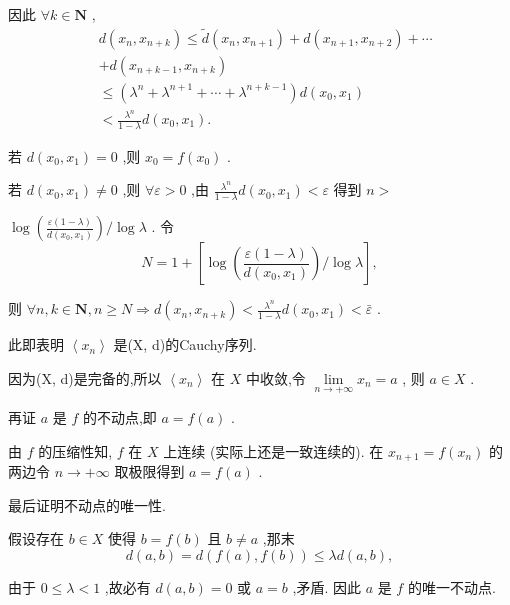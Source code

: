 因此 $\forall k \in  \mathbf{N}$ ,
\begin{align*}
	&d\left( {{x}_{n},{x}_{n + k}}\right)  \leq  \widetilde{d}\left( {{x}_{n},{x}_{n + 1}}\right)  + d\left( {{x}_{n + 1},{x}_{n + 2}}\right)  + \cdots\\
	&+ d\left( {{x}_{n + k - 1},{x}_{n + k}}\right)\\
	&\leq  \left( {{\lambda }^{n} + {\lambda }^{n + 1} + \cdots  + {\lambda }^{n + k - 1}}\right) d\left( {{x}_{0},{x}_{1}}\right)\\
	&< \frac{{\lambda }^{n}}{1 - \lambda }d\left( {{x}_{0},{x}_{1}}\right) .
\end{align*}

若 $d\left( {{x}_{0},{x}_{1}}\right)  = 0$ ,则 ${x}_{0} = f\left( {x}_{0}\right)$ .

若 $d\left( {{x}_{0},{x}_{1}}\right)  \neq  0$ ,则 $\forall \varepsilon  > 0$ ,由 $\frac{{\lambda }^{n}}{1 - \lambda }d\left( {{x}_{0},{x}_{1}}\right)  < \varepsilon$ 得到 $n >$

$\log \left( \frac{\varepsilon \left( {1 - \lambda }\right) }{d\left( {{x}_{0},{x}_{1}}\right) }\right) /\log \lambda$ . 令
$$N = 1 + \left\lbrack  {\log \left( \frac{\varepsilon \left( {1 - \lambda }\right) }{d\left( {{x}_{0},{x}_{1}}\right) }\right) /\log \lambda }\right\rbrack  ,$$

则 $\forall n,k \in  \mathbf{N},n \geq  N \Rightarrow  d\left( {{x}_{n},{x}_{n + k}}\right)  < \frac{{\lambda }^{n}}{1 - \lambda }d\left( {{x}_{0},{x}_{1}}\right)  < \bar{\varepsilon }$ .

此即表明 $\left\langle  {x}_{n}\right\rangle$ 是(X, d)的Cauchy序列.

因为(X, d)是完备的,所以 $\left\langle  {x}_{n}\right\rangle$ 在 $X$ 中收敛,令 $\mathop{\lim }\limits_{{n \rightarrow   + \infty }}{x}_{n} = a$ , 则 $a \in  X$ .

再证 $a$ 是 $f$ 的不动点,即 $a = f\left( a\right)$ .

由 $f$ 的压缩性知, $f$ 在 $X$ 上连续 (实际上还是一致连续的). 在 ${x}_{n + 1} = f\left( {x}_{n}\right)$ 的两边令 $n \rightarrow   + \infty$ 取极限得到 $a = f\left( a\right)$ .

最后证明不动点的唯一性.

假设存在 $b \in  X$ 使得 $b = f\left( b\right)$ 且 $b \neq  a$ ,那末
$$d\left( {a,b}\right)  = d\left( {f\left( a\right) ,f\left( b\right) }\right)  \leq  {\lambda d}\left( {a,b}\right) ,$$

由于 $0 \leq  \lambda  < 1$ ,故必有 $d\left( {a,b}\right)  = 0$ 或 $a = b$ ,矛盾. 因此 $a$ 是 $f$ 的唯一不动点.

